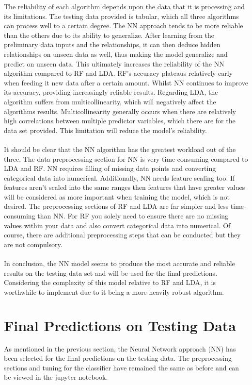 \documentclass{article}
\begin{document}
The reliability of each algorithm depends upon the data that it is processing and its limitations. The testing data provided is tabular, which all three algorithms can process well to a certain degree. The NN approach tends to be more reliable than the others due to its ability to generalize. After learning from the preliminary data inputs and the relationships, it can then deduce hidden relationships on unseen data as well, thus making the model generalize and predict on unseen data. This ultimately increases the reliability of the NN algorithm compared to RF and LDA. RF’s accuracy plateaus relatively early when feeding it new data after a certain amount. Whilst NN continues to improve its accuracy, providing increasingly reliable results. Regarding LDA, the algorithm suffers from multicollinearity, which will negatively affect the algorithms results. Multicollinearity generally occurs when there are relatively high correlations between multiple predictor variables, which there are for the data set provided. This limitation will reduce the model’s reliability.\\ \\

It should be clear that the NN algorithm has the greatest workload out of the three. The data preprocessing section for NN is very time-consuming compared to LDA and RF. NN requires filling of missing data points and converting categorical data into numerical. Additionally, NN needs feature scaling too. If features aren’t scaled into the same ranges then features that have greater values will be considered as more important when training the model, which is not desired. The preprocessing sections of RF and LDA are far simpler and less time-consuming than NN. For RF you solely need to ensure there are no missing values within your data and also convert categorical data into numerical. Of course, there are additional preprocessing steps that can be conducted but they are not compulsory.\\ \\
 
In conclusion, the NN model seems to produce the most accurate and reliable results on the testing data set and will be used for the final predictions. Considering the complexity of this model relative to RF and LDA, it is worthwhile to implement due to it being a more heavily robust algorithm.

\section{Final Predictions on Testing Data}
As mentioned in the previous section, the Neural Network approach (NN) has been selected for the final predictions on the testing data. The preprocessing sections and tuning for the classifier have remained the same as before and can be viewed in the jupyter notebook.
\end{document}
